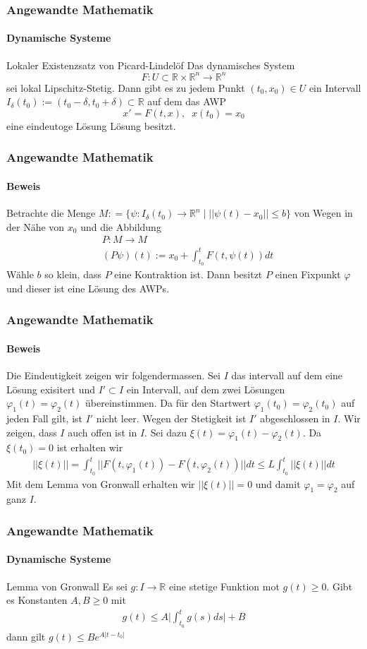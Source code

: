 \documentclass{beamer}
\begin{document}
\begin{frame}
    \frametitle{Angewandte Mathematik}
\framesubtitle{Dynamische Systeme }
\begin{block}{Lokaler Existenzsatz von Picard-Lindelöf}
Das dynamisches System  $$F : U \subset \mathbb{R} \times \mathbb{R}^n \to \mathbb{R}^n$$ sei lokal Lipschitz-Stetig. 
Dann gibt es zu jedem Punkt $(t_0, x_0) \in U$ ein Intervall $I_\delta (t_0) := (t_0 - \delta, t_0 + \delta) \subset \mathbb{R}$ auf dem das AWP 
$$ x' = F(t,x), \; \; x(t_0) = x_0$$
eine eindeutoge Lösung Lösung besitzt.
\end{block}

 \end{frame}

\begin{frame}
    \frametitle{Angewandte Mathematik}
\framesubtitle{Beweis}
Betrachte die Menge  $M: = \{ \psi : I_\delta (t_0) \to \mathbb{R}^n \; | \; ||\psi(t) - x_0 || \leq b  \}$ von Wegen in der Nähe von $x_0$ und die Abbildung
\begin{align*}
& P : M \to M \\
& (P \psi)(t) := x_0 + \int_{t_0}^{t} F(t, \psi(t)) dt
\end{align*}
Wähle $b$ so klein, dass $P$ eine Kontraktion ist. Dann besitzt $P$ einen Fixpunkt $\varphi$ und dieser ist eine Lösung des AWPs.
 \end{frame}


 \begin{frame}
    \frametitle{Angewandte Mathematik}
\framesubtitle{Beweis}
Die Eindeutigkeit zeigen wir folgendermassen. Sei $I$ das intervall auf dem eine Lösung exisitert und $I' \subset I$ ein Intervall, 
auf dem zwei Lösungen $\varphi_1(t) = \varphi_2(t)$ übereinstimmen. Da für den Startwert $\varphi_1(t_0) = \varphi_2(t_0)$ auf jeden Fall gilt, ist $I'$ nicht leer.
Wegen der Stetigkeit ist $I'$ abgeschlossen in $I$. Wir zeigen, dass $I$ auch offen ist in $I$. Sei dazu $\xi(t) = \varphi_1(t) - \varphi_2(t)$.
Da $\xi(t_0) = 0$ ist erhalten wir 
\begin{align*}
||\xi(t) || =  \int_{t_0}^{t}  ||F(t, \varphi_1(t)) - F(t, \varphi_2(t)) || dt \leq L \int_{t_0}^{t} || \xi(t) || dt
\end{align*}
Mit dem Lemma von Gronwall erhalten wir $|| \xi(t) || = 0$ und damit $\varphi_1 = \varphi_2$ auf ganz $I$.
 \end{frame}



 \begin{frame}
    \frametitle{Angewandte Mathematik}
\framesubtitle{Dynamische Systeme }
\begin{block}{Lemma von Gronwall}
Es sei $g: I \to \mathbb{R}$ eine stetige Funktion mot $g(t) \geq 0$. Gibt es Konstanten $A,B \geq 0$ mit
\begin{align*}
g(t) \leq A \biggl | \int_{t_0}^{t} g(s) ds \biggr | + B
\end{align*}
dann gilt $g(t) \leq B e^{A |t- t_0|}$    
\end{block}

 \end{frame}
\end{document}
